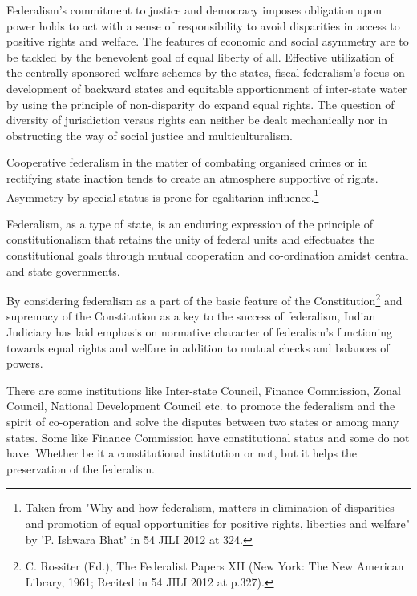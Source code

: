 \begin{multicols}{2}
\vspace{-.12cm}

\noi
Federalism's commitment to justice and democracy imposes obligation upon power holds to act
with a sense of responsibility to avoid disparities in access to positive rights and welfare. The
features of economic and social asymmetry are to be tackled by the benevolent goal of equal
liberty of all. Effective utilization of the centrally sponsored welfare schemes by the states, fiscal
federalism's focus on development of backward states and equitable apportionment of inter-state
water by using the principle of non-disparity do expand equal rights. The question of diversity of
jurisdiction versus rights can neither be dealt mechanically nor in obstructing the way of social
justice and multiculturalism.

\vspace{-.12cm}

\noi
Cooperative federalism in the matter of combating organised crimes or in rectifying state inaction
tends to create an atmosphere supportive of rights. Asymmetry by special status is prone for
egalitarian influence.\footnote{Taken from "Why and how federalism, matters in elimination of disparities and promotion of equal opportunities for positive rights, liberties and welfare" by 'P. Ishwara Bhat' in 54 JILI 2012 at 324.}

\vspace{-.12cm}

\noi
Federalism, as a type of state, is an enduring expression of the principle of constitutionalism that
retains the unity of federal units and effectuates the constitutional goals through mutual cooperation and co-ordination amidst central and state governments.

\vspace{-.1cm}

\noi
By considering federalism as a part of the basic feature of the Constitution\footnote{C. Rossiter (Ed.), The Federalist Papers XII (New York: The New American Library, 1961; Recited in 54 JILI 2012 at p.327).} and supremacy of the Constitution as a key to the success of federalism, Indian Judiciary has laid emphasis on normative character of federalism's functioning towards equal rights and welfare in addition to mutual checks and balances of powers.

\vspace{-.1cm}

\noi
There are some institutions like Inter-state Council, Finance Commission, Zonal Council,
National Development Council etc. to promote the federalism and the spirit of co-operation and
solve the disputes between two states or among many states. Some like Finance Commission have
constitutional status and some do not have. Whether be it a constitutional institution or not, but it
helps the preservation of the federalism.


\end{multicols}
